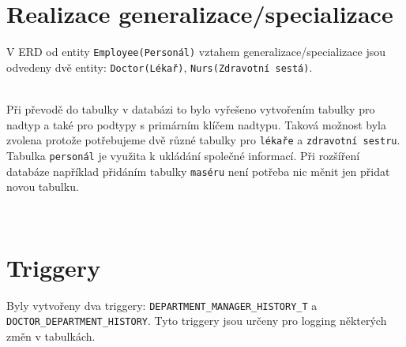\documentclass[a4paper,11pt]{article}
\begin{document}
\section{Realizace generalizace/specializace}
V ERD od entity \texttt{Employee(Personál)} vztahem generalizace/specializace jsou odvedeny dvě entity: \texttt{Doctor(Lékař)}, \texttt{Nurs(Zdravotní sestá)}.\\
\begin{figure}[h!]
\label{obrazek:3}
\end{figure}\\
Při převodě do tabulky v databázi to bylo vyřešeno
vytvořením tabulky pro nadtyp a také  pro podtypy s primárním klíčem nadtypu. Taková možnost byla zvolena protože potřebujeme dvě různé tabulky pro \texttt{lékaře} a \texttt{zdravotní sestru}. Tabulka \texttt{personál} je využita k ukládání společné informací. Při rozšíření databáze například přidáním tabulky \texttt{maséru} není potřeba nic měnit jen přidat novou tabulku.
\begin{figure}[h!]
\label{obrazek:3}
\end{figure}\\

\section{Triggery}
Byly vytvořeny dva triggery: \texttt{DEPARTMENT\_MANAGER\_HISTORY\_T} a \texttt{DOCTOR\_DEPARTMENT\_HISTORY}.
Tyto triggery jsou určeny pro logging některých změn v tabulkách. \\
\end{document}
